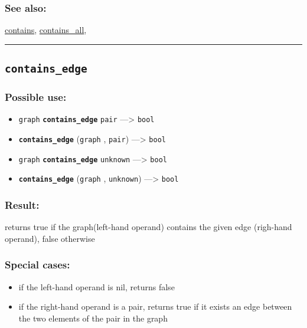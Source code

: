 \documentclass[]{book}
\providecommand{\tightlist}{%
  \setlength{\itemsep}{0pt}\setlength{\parskip}{0pt}}
\theoremstyle{definition}
\theoremstyle{definition}
\theoremstyle{definition}
\theoremstyle{remark}
\begin{document}
\subsubsection{See also:}\label{see-also-64}

\href{OperatorsBC\#contains}{contains},
\href{OperatorsBC\#contains_all}{contains\_all},

\begin{center}\rule{0.5\linewidth}{\linethickness}\end{center}

\subsection{\texorpdfstring{\texttt{contains\_edge}}{contains\_edge}}\label{contains_edge}

\subsubsection{Possible use:}\label{possible-use-102}

\begin{itemize}
\tightlist
\item
  \texttt{graph} \textbf{\texttt{contains\_edge}} \texttt{pair}
  ---\textgreater{} \texttt{bool}
\item
  \textbf{\texttt{contains\_edge}} (\texttt{graph} , \texttt{pair})
  ---\textgreater{} \texttt{bool}
\item
  \texttt{graph} \textbf{\texttt{contains\_edge}} \texttt{unknown}
  ---\textgreater{} \texttt{bool}
\item
  \textbf{\texttt{contains\_edge}} (\texttt{graph} , \texttt{unknown})
  ---\textgreater{} \texttt{bool}
\end{itemize}

\subsubsection{Result:}\label{result-100}

returns true if the graph(left-hand operand) contains the given edge
(righ-hand operand), false otherwise

\subsubsection{Special cases:}\label{special-cases-35}

\begin{itemize}
\tightlist
\item
  if the left-hand operand is nil, returns false\\
\item
  if the right-hand operand is a pair, returns true if it exists an edge
  between the two elements of the pair in the graph
\end{itemize}
\end{document}
